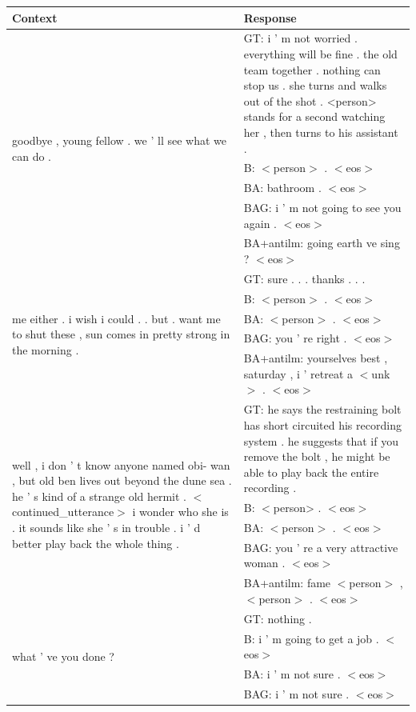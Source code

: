 \documentclass[%
 reprint,
 amsmath,amssymb,
 aps,
]{revtex4-1}
\begin{document}
\begin{table}[t]
\centering
\begin{tabular}{| m{8cm} | m{8cm}| } 
 \hline
 Context & Response \\
 \hline
 \multirow{5}{8cm}{goodbye , young fellow . we ' ll see what we can do .
} & GT: i ' m not worried . everything will be fine . the old team together . nothing can stop us . she turns and walks out of the shot . <person> stands for a second watching her , then turns to his assistant . \\ 
 & B: $<$person$>$ . $<$eos$>$ \\
 & BA: bathroom . $<$eos$>$ \\
 & BAG: i ' m not going to see you again . $<$eos$>$ \\
 & BA+antilm: going earth ve sing ? $<$eos$>$\\
 \hline
  \multirow{5}{8cm}{me either . i wish i could . . but . want me to shut these , sun comes in pretty strong in the morning .} & GT: sure . . . thanks . . . \\ 
 & B: $<$person$>$ . $<$eos$>$ \\
 & BA: $<$person$>$ . $<$eos$>$ \\
 & BAG: you ' re right . $<$eos$>$ \\
 & BA+antilm: yourselves best , saturday , i ' retreat a $<$unk$>$ . $<$eos$>$\\
 \hline
\multirow{5}{8cm}{well , i don ' t know anyone named obi- wan , but old ben lives out beyond the dune sea . he ' s kind of a strange old hermit . $<$continued\_utterance$>$ i wonder who she is . it sounds like she ' s in trouble . i ' d better play back the whole thing .} & GT: he says the restraining bolt has short circuited his recording system . he suggests that if you remove the bolt , he might be able to play back the entire recording . \\ 
 & B: $<$person> . $<$eos$>$  \\
 & BA: $<$person$>$ . $<$eos$>$ \\
 & BAG: you ' re a very attractive woman . $<$eos$>$ \\
 & BA+antilm: fame $<$person$>$ , $<$person$>$ . $<$eos$>$ \\
 \hline
 \multirow{5}{8cm}{what ' ve you done ?} & GT: nothing . \\ 
 & B: i ' m going to get a job . $<$eos$>$ \\
 & BA: i ' m not sure . $<$eos$>$ \\
 & BAG: i ' m not sure . $<$eos$>$ \\

\end{tabular}
\end{table}
\end{document}
